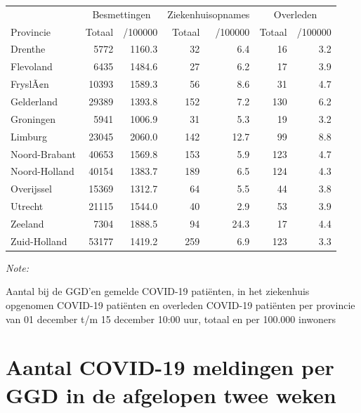 \documentclass[
  english,
  man,floatsintext]{apa6}
\begin{document}
\begin{table}
\centering
\begin{threeparttable}
\begin{tabular}{lrrrrrr}
\toprule
\multicolumn{1}{c}{ } & \multicolumn{2}{c}{Besmettingen} & \multicolumn{2}{c}{Ziekenhuisopnames} & \multicolumn{2}{c}{Overleden} \\
\cmidrule(l{3pt}r{3pt}){2-3} \cmidrule(l{3pt}r{3pt}){4-5} \cmidrule(l{3pt}r{3pt}){6-7}
Provincie & Totaal & /100000 & Totaal & /100000 & Totaal & /100000\\
\midrule
Drenthe & 5772 & 1160.3 & 32 & 6.4 & 16 & 3.2\\
Flevoland & 6435 & 1484.6 & 27 & 6.2 & 17 & 3.9\\
FryslÃ¢n & 10393 & 1589.3 & 56 & 8.6 & 31 & 4.7\\
Gelderland & 29389 & 1393.8 & 152 & 7.2 & 130 & 6.2\\
Groningen & 5941 & 1006.9 & 31 & 5.3 & 19 & 3.2\\
Limburg & 23045 & 2060.0 & 142 & 12.7 & 99 & 8.8\\
Noord-Brabant & 40653 & 1569.8 & 153 & 5.9 & 123 & 4.7\\
Noord-Holland & 40154 & 1383.7 & 189 & 6.5 & 124 & 4.3\\
Overijssel & 15369 & 1312.7 & 64 & 5.5 & 44 & 3.8\\
Utrecht & 21115 & 1544.0 & 40 & 2.9 & 53 & 3.9\\
Zeeland & 7304 & 1888.5 & 94 & 24.3 & 17 & 4.4\\
Zuid-Holland & 53177 & 1419.2 & 259 & 6.9 & 123 & 3.3\\
\bottomrule
\end{tabular}
\begin{tablenotes}
\item \textit{Note: } 
\item Aantal bij de GGD’en gemelde COVID-19 patiënten, in het ziekenhuis opgenomen COVID-19 patiënten en overleden COVID-19 patiënten per provincie van 01 december t/m 15 december 10:00 uur, totaal en per 100.000 inwoners
\end{tablenotes}
\end{threeparttable}
\end{table}

\newpage

\hypertarget{aantal-covid-19-meldingen-per-ggd-in-de-afgelopen-twee-weken}{%
\section{Aantal COVID-19 meldingen per GGD in de afgelopen twee weken}\label{aantal-covid-19-meldingen-per-ggd-in-de-afgelopen-twee-weken}}
\end{document}
